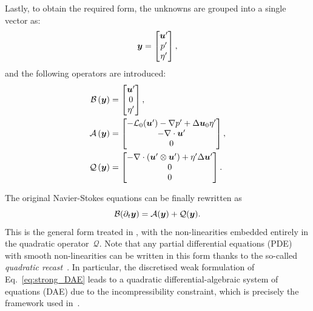 \documentclass[%
reprint,
superscriptaddress,
 amsmath,amssymb,
 aps,
 pre
]{revtex4-2}
\begin{document}
%
Lastly, to obtain the required form, the unknowns are grouped into a single vector as:
\begin{equation}
    {\boldsymbol{y}} = \begin{bmatrix}
        {\boldsymbol{u}}'\\
        p'\\
        \eta'
    \end{bmatrix},
\end{equation}
and the following operators are introduced:
\begin{subequations}
\label{eq:operators}
    \begin{align}
    \mathcal{B}\left(
    {\boldsymbol{y}}
    \right)
    &=
    \begin{bmatrix}
        {\boldsymbol{u}}'\\
        0\\
        \eta'
    \end{bmatrix},\\
    \mathcal{A}\left(
    {\boldsymbol{y}}
    \right)
    &=
    \begin{bmatrix}
    -\mathcal{L}_0({\boldsymbol{u}}')-\nabla p'+\Delta{\boldsymbol{u}}_0 \eta'\\
    -\nabla \cdot {\boldsymbol{u}}'\\
    0
    \end{bmatrix},\\
    \mathcal{Q}\left(
    {\boldsymbol{y}}
    \right)
    &=
    \begin{bmatrix}
    -\nabla \cdot ({\boldsymbol{u}}' \otimes {\boldsymbol{u}}') +
    \eta' \Delta {\boldsymbol{u}}' \\
    0\\
    0
    \end{bmatrix}.
    \end{align}
\end{subequations}

The original Navier-Stokes equations can be finally rewritten as
\begin{equation}
\label{eq:strong_DAE}
    \mathcal{B}(\partial_t {\boldsymbol{y}}) = 
    \mathcal{A}({\boldsymbol{y}}) + \mathcal{Q}({\boldsymbol{y}}).
\end{equation}
This is the general form treated in \cite{vizza2023superharm,Stabile:follow}, with the non-linearities embedded entirely in the quadratic operator~$\mathcal{Q}$. Note that any partial differential equations (PDE) with smooth non-linearities can be written in this form thanks to the so-called \textit{quadratic recast}~\cite{Guillot:recast}. In particular, the discretised weak formulation of Eq.~\eqref{eq:strong_DAE} leads to a quadratic differential-algebraic system of equations (DAE) due to the incompressibility constraint, which is precisely the framework used in~\cite{vizza2023superharm,Stabile:follow}.
\end{document}
